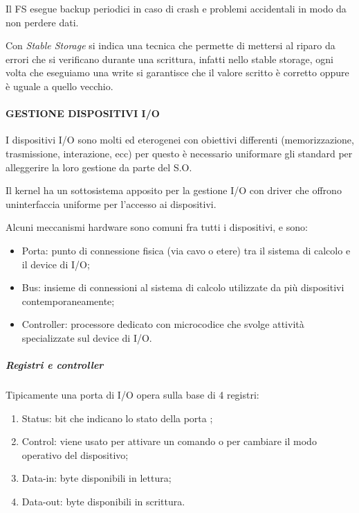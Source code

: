 Il FS esegue backup periodici in caso di crash e problemi accidentali in
modo da non perdere dati.

Con \emph{Stable Storage} si indica una tecnica che permette di mettersi
al riparo da errori che si verificano durante una scrittura, infatti
nello stable storage, ogni volta che eseguiamo una write si garantisce
che il valore scritto è corretto oppure è uguale a quello vecchio.

\paragraph{GESTIONE DISPOSITIVI I/O}\label{gestione-dispositivi-io}

I dispositivi I/O sono molti ed eterogenei con obiettivi differenti
(memorizzazione, trasmissione, interazione, ecc) per questo è necessario
uniformare gli standard per alleggerire la loro gestione da parte del
S.O.

Il kernel ha un sottosistema apposito per la gestione I/O con driver che
offrono un\textquotesingle interfaccia uniforme per l'accesso ai
dispositivi.

Alcuni meccanismi hardware sono comuni fra tutti i dispositivi, e sono:

\begin{itemize}
\item
  Porta: punto di connessione fisica (via cavo o etere) tra il sistema
  di calcolo e il device di I/O;
\item
  Bus: insieme di connessioni al sistema di calcolo utilizzate da più
  dispositivi contemporaneamente;
\item
  Controller: processore dedicato con microcodice che svolge attività
  specializzate sul device di I/O.
\end{itemize}

\subparagraph{Registri e controller}\label{registri-e-controller}

Tipicamente una porta di I/O opera sulla base di 4 registri:

\begin{enumerate}
\def\labelenumi{\arabic{enumi}.}
\item
  Status: bit che indicano lo stato della porta ;
\item
  Control: viene usato per attivare un comando o per cambiare il modo
  operativo del dispositivo;
\item
  Data-in: byte disponibili in lettura;
\item
  Data-out: byte disponibili in scrittura.
\end{enumerate}

